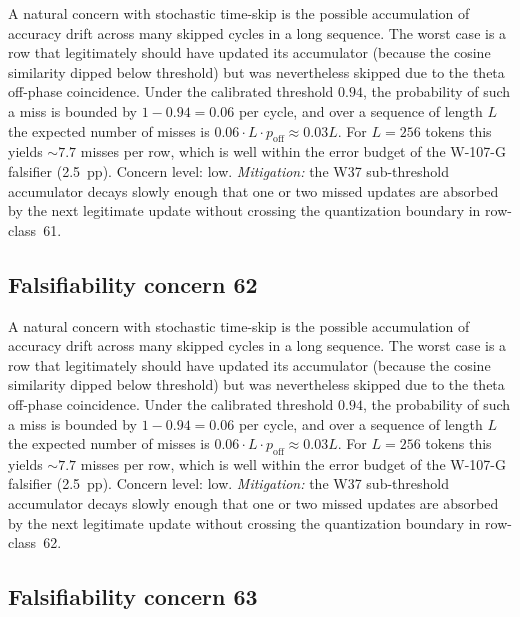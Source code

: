 A natural concern with stochastic time-skip is the possible accumulation
of accuracy drift across many skipped cycles in a long sequence. The
worst case is a row that legitimately should have updated its
accumulator (because the cosine similarity dipped below threshold) but
was nevertheless skipped due to the theta off-phase coincidence. Under
the calibrated threshold $0.94$, the probability of such a miss is
bounded by $1 - 0.94 = 0.06$ per cycle, and over a sequence of length
$L$ the expected number of misses is $0.06 \cdot L \cdot p_{\mathrm{off}}
\approx 0.03 L$. For $L = 256$ tokens this yields $\sim 7.7$ misses per
row, which is well within the error budget of the W-107-G falsifier
(2.5~pp). Concern level: low. \emph{Mitigation:} the W37 sub-threshold
accumulator decays slowly enough that one or two missed updates are
absorbed by the next legitimate update without crossing the
quantization boundary in row-class~61.


\subsection{Falsifiability concern 62}

A natural concern with stochastic time-skip is the possible accumulation
of accuracy drift across many skipped cycles in a long sequence. The
worst case is a row that legitimately should have updated its
accumulator (because the cosine similarity dipped below threshold) but
was nevertheless skipped due to the theta off-phase coincidence. Under
the calibrated threshold $0.94$, the probability of such a miss is
bounded by $1 - 0.94 = 0.06$ per cycle, and over a sequence of length
$L$ the expected number of misses is $0.06 \cdot L \cdot p_{\mathrm{off}}
\approx 0.03 L$. For $L = 256$ tokens this yields $\sim 7.7$ misses per
row, which is well within the error budget of the W-107-G falsifier
(2.5~pp). Concern level: low. \emph{Mitigation:} the W37 sub-threshold
accumulator decays slowly enough that one or two missed updates are
absorbed by the next legitimate update without crossing the
quantization boundary in row-class~62.


\subsection{Falsifiability concern 63}

